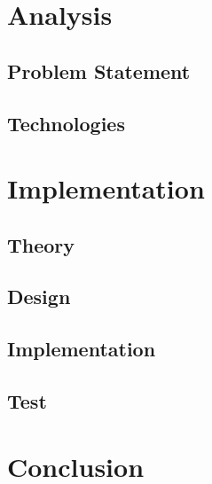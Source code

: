 




 
\tableofcontents



\part{Analysis}




\chapter{Problem Statement}



\chapter{Technologies}


\part{Implementation}

\chapter{Theory}

\chapter{Design}

\chapter{Implementation}

\chapter{Test}


\part{Conclusion}

